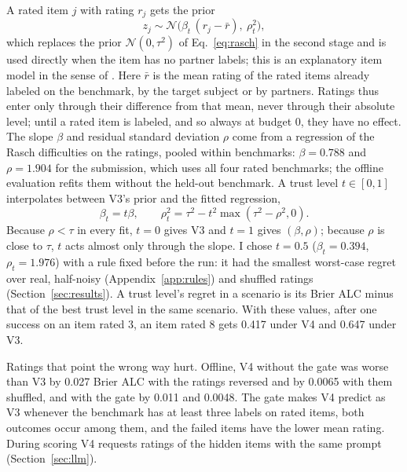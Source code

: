 A rated item $j$ with rating $r_j$ gets the prior
\begin{equation}
  z_j \sim \mathcal{N}\bigl(\beta_t\,(r_j - \bar r),\ \rho_t^2\bigr),
  \nonumber
\end{equation}
which replaces the prior $\mathcal{N}(0, \tau^2)$ of Eq.~\eqref{eq:rasch} in the second stage and is used directly when the item has no partner labels; this is an explanatory item model in the sense of \citet{deboeck2004explanatory}. Here $\bar r$ is the mean rating of the rated items already labeled on the benchmark, by the target subject or by partners. Ratings thus enter only through their difference from that mean, never through their absolute level; until a rated item is labeled, and so always at budget 0, they have no effect. The slope $\beta$ and residual standard deviation $\rho$ come from a regression of the Rasch difficulties on the ratings, pooled within benchmarks: $\beta = 0.788$ and $\rho = 1.904$ for the submission, which uses all four rated benchmarks; the offline evaluation refits them without the held-out benchmark. A trust level $t \in [0, 1]$ interpolates between V3's prior and the fitted regression,
\begin{equation}
  \beta_t = t\beta, \qquad \rho_t^2 = \tau^2 - t^2 \max(\tau^2 - \rho^2, 0).
  \label{eq:trust}
\end{equation}
Because $\rho < \tau$ in every fit, $t = 0$ gives V3 and $t = 1$ gives $(\beta, \rho)$; because $\rho$ is close to $\tau$, $t$ acts almost only through the slope. I chose $t = 0.5$ ($\beta_t = 0.394$, $\rho_t = 1.976$) with a rule fixed before the run: it had the smallest worst-case regret over real, half-noisy (Appendix~\ref{app:rules}) and shuffled ratings (Section~\ref{sec:results}). A trust level's regret in a scenario is its Brier ALC minus that of the best trust level in the same scenario. With these values, after one success on an item rated 3, an item rated 8 gets 0.417 under V4 and 0.647 under V3.

Ratings that point the wrong way hurt. Offline, V4 without the gate was worse than V3 by 0.027 Brier ALC with the ratings reversed and by 0.0065 with them shuffled, and with the gate by 0.011 and 0.0048. The gate makes V4 predict as V3 whenever the benchmark has at least three labels on rated items, both outcomes occur among them, and the failed items have the lower mean rating. During scoring V4 requests ratings of the hidden items with the same prompt (Section~\ref{sec:llm}).

